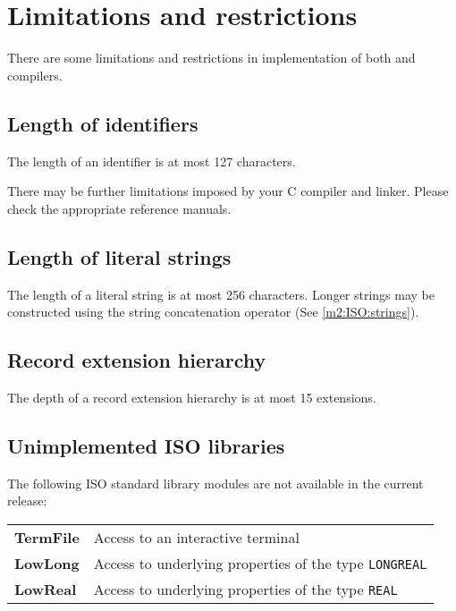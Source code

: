 \chapter{Limitations and restrictions}\label{limits}

There are some limitations and restrictions in implementation of both
\mt{} and \ot{} compilers.

\section*{Length of identifiers}

The length of an identifier is at most 127 characters.

\ifgenc
There may be further limitations imposed by your C compiler and linker.
Please check the appropriate reference manuals.
\fi

\section*{Length of literal strings}

The  length of a literal string is at most 256 characters. Longer
strings  may  be  constructed  using the string concatenation
operator (See \ref{m2:ISO:strings}).

\section*{Record extension hierarchy}

The depth of a record extension hierarchy is at most 15 extensions.

\section*{Unimplemented ISO libraries}

\ifgenc
The following \mt{} ISO standard library modules are not
available in the current release:
\begin{flushleft}
\begin{tabular}{ll}
\bf TermFile & Access to an interactive terminal                      \\
\bf LowLong  & Access to underlying properties of the type {\tt LONGREAL}   \\
\bf LowReal  & Access to underlying properties of the type {\tt REAL}   \\
\end{tabular}
\end{flushleft}
\fi


